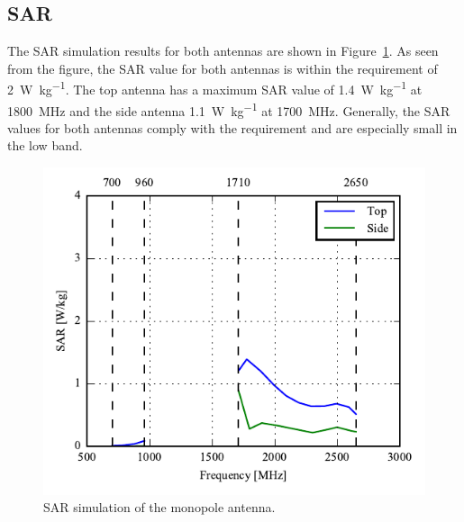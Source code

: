 \FloatBarrier
\subsection{SAR} %
The SAR simulation results for both antennas are shown in Figure~\ref{fig:sol1_sar}. As seen from the figure, the SAR value for both antennas is within the requirement of \SI{2}{W\per kg}. The top antenna has a maximum SAR value of \SI{1.4}{W\per kg} at \SI{1800}{MHz} and the side antenna \SI{1.1}{W\per kg} at \SI{1700}{MHz}. Generally, the SAR values for both antennas comply with the requirement and are especially small in the low band.
\begin{figure}[htbp]
    \centering
    \includegraphics{img/tech_sol/monopole/sar/Top_antenna.pdf}
    \caption{SAR simulation of the monopole antenna.}
    \label{fig:sol1_sar}
\end{figure}

